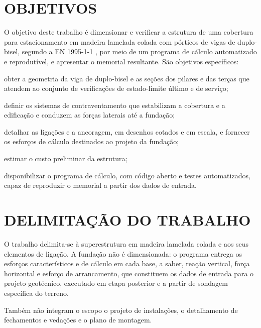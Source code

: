 \section{OBJETIVOS}\label{sec:objetivos}\label{sec:objetivo-geral}

O objetivo deste trabalho é dimensionar e verificar a estrutura de uma cobertura
para estacionamento em madeira lamelada colada com pórticos de vigas de duplo-bisel, segundo a
EN 1995-1-1 \cite{EN1995-1-1:2004}, por meio de um programa de cálculo
automatizado e reprodutível, e apresentar o memorial resultante. São objetivos
específicos:\label{sec:objetivos-especificos}

\begin{alineas}
    \item obter a geometria da viga de duplo-bisel e as seções dos pilares e das
    terças que atendem ao conjunto de verificações de estado-limite último e de
    serviço;

    \item definir os sistemas de contraventamento que estabilizam a cobertura e a
    edificação e conduzem as forças laterais até a fundação;

    \item detalhar as ligações e a ancoragem, em desenhos cotados e em escala, e
    fornecer os esforços de cálculo destinados ao projeto da fundação;

    \item estimar o custo preliminar da estrutura;

    \item disponibilizar o programa de cálculo, com código aberto e testes
    automatizados, capaz de reproduzir o memorial a partir dos dados de entrada.
\end{alineas}

\section{DELIMITAÇÃO DO TRABALHO}\label{sec:delimitacao}

O trabalho delimita-se à superestrutura em madeira lamelada colada e aos seus
elementos de ligação. A fundação não é dimensionada: o programa entrega os
esforços característicos e de cálculo em cada base, a saber, reação vertical,
força horizontal e esforço de arrancamento, que constituem os dados de entrada
para o projeto geotécnico, executado em etapa posterior e a partir de sondagem
específica do terreno.

Também não integram o escopo o projeto de instalações, o detalhamento de
fechamentos e vedações e o plano de montagem.

